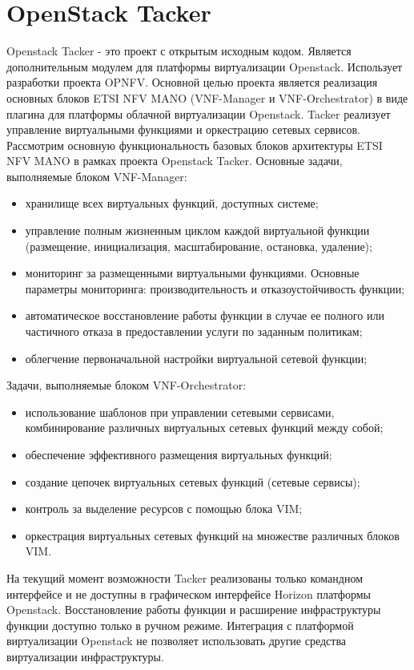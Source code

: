 \documentclass[oneside,final,14pt,a4paper]{extreport}
\begin{document}
\section{OpenStack Tacker}
Openstack Tacker - это проект с открытым исходным кодом. Является дополнительным модулем для платформы виртуализации Openstack. Использует разработки проекта OPNFV. Основной целью проекта является реализация основных блоков ETSI NFV MANO (VNF-Manager и VNF-Orchestrator) в виде плагина для платформы облачной виртуализации Openstack. Tacker реализует управление виртуальными функциями и оркестрацию сетевых сервисов.
	Рассмотрим основную функциональность базовых блоков архитектуры ETSI NFV MANO в рамках проекта Openstack Tacker. Основные задачи, выполняемые блоком VNF-Manager:
\begin{itemize}
	\item хранилище всех виртуальных функций, доступных системе;
	\item управление полным жизненным циклом каждой виртуальной функции (размещение, инициализация, масштабирование, остановка, удаление);
	\item мониторинг за размещенными виртуальными функциями. Основные параметры мониторинга: производительность и отказоустойчивость функции;
	\item автоматическое восстановление работы функции в случае ее полного или частичного отказа в предоставлении услуги по заданным политикам;
	\item облегчение первоначальной настройки виртуальной сетевой функции;
\end{itemize}
Задачи, выполняемые блоком VNF-Orchestrator:
\begin{itemize}
	\item использование шаблонов при управлении сетевыми сервисами, комбинирование различных виртуальных сетевых функций между собой;
	\item обеспечение эффективного размещения виртуальных функций;
	\item создание цепочек виртуальных сетевых функций (сетевые сервисы);
	\item контроль за выделение ресурсов с помощью блока VIM;
	\item оркестрация виртуальных сетевых функций на множестве различных блоков VIM.
\end{itemize}

На текущий момент возможности Tacker реализованы только командном интерфейсе и не доступны в графическом интерфейсе Horizon платформы Openstack.\cite{tacker-official} 
Восстановление работы функции и расширение инфраструктуры функции доступно только в ручном режиме. Интеграция с платформой виртуализации Openstack не позволяет использовать другие средства виртуализации инфраструктуры.
\end{document}
